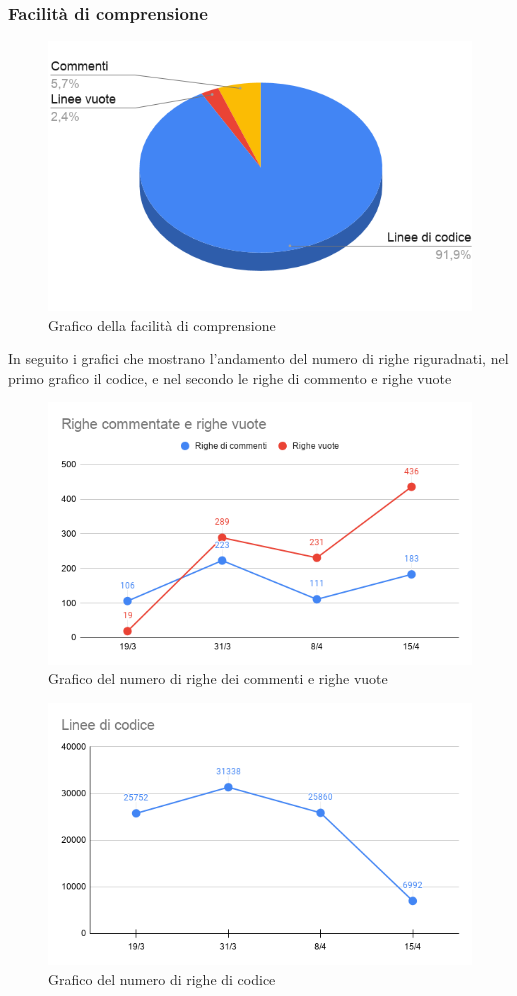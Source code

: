     \subsubsection{Facilità di comprensione}

        \begin{figure}[H]
            \centering
            \includegraphics[width=10 cm]{source/sections/images/facilitaDelCodice.png}
            \caption{Grafico della facilità di comprensione}
        \end{figure}

    In seguito i grafici che mostrano l'andamento del numero di righe riguradnati, nel primo grafico il codice, e nel secondo
    le righe di commento e righe vuote

    \begin{figure}[H]
        \centering
        \includegraphics[width=10 cm]{source/sections/images/Valori-delle-righe.png}
        \caption{Grafico del numero di righe dei commenti e righe vuote}
    \end{figure}

    \begin{figure}[H]
        \centering
        \includegraphics[width=10 cm]{source/sections/images/numCodice.png}
        \caption{Grafico del numero di righe di codice}
    \end{figure}

